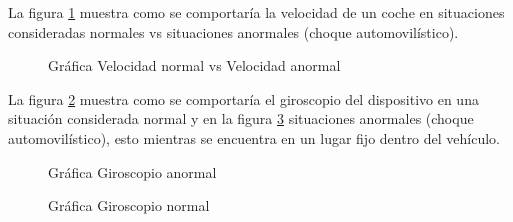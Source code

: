 La figura \ref{fig:NotificaAutoV} muestra como se comportaría la velocidad de un coche en situaciones consideradas normales vs situaciones anormales (choque automovilístico).
\begin{figure}[htbp!]
	\centering
	\caption{Gráfica Velocidad normal vs Velocidad anormal}
	\label{fig:NotificaAutoV}
\end{figure}
La figura \ref{fig:NotificaAutoG} muestra como se comportaría el giroscopio del dispositivo en una situación considerada normal  y en la figura \ref{fig:NotificaAutoGA} situaciones anormales (choque automovilístico), esto mientras se encuentra en un lugar fijo dentro del vehículo.
\begin{figure}[htbp!]
	\centering
	\caption{Gráfica Giroscopio anormal}
	\label{fig:NotificaAutoG}
\end{figure}
\begin{figure}[htbp!]
	\centering
	\caption{Gráfica Giroscopio normal}
	\label{fig:NotificaAutoGA}
\end{figure}

